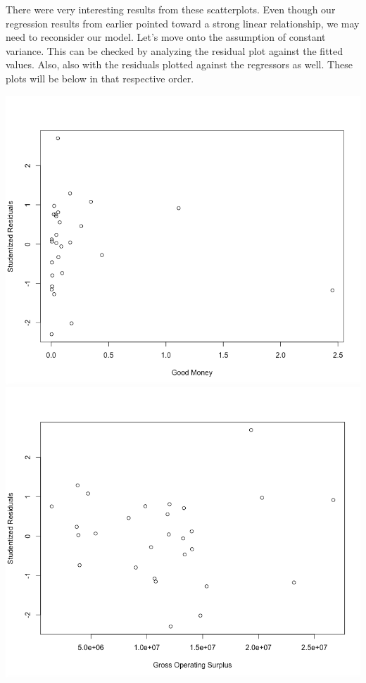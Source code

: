 \documentclass[12pt,letterpaper]{article}
\begin{document}
There were very interesting results from these scatterplots. Even though our regression results from earlier pointed toward a strong linear relationship, we may need to reconsider our model. Let's move onto the assumption of constant variance. This can be checked by analyzing the residual plot against the fitted values. Also, also with the residuals plotted against the regressors as well. These plots will be below in that respective order.

\begin{center}
\includegraphics[scale=0.3]{pic4.png}
\includegraphics[scale=0.3]{pic5.png}

\end{center}
\end{document}
